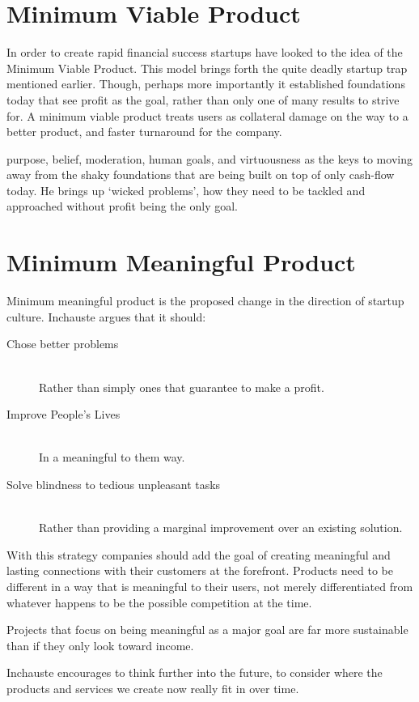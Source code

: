 \section{Minimum Viable Product}

In order to create rapid financial success startups have looked to the idea of the Minimum Viable Product. This model brings forth the quite deadly startup trap mentioned earlier. Though, perhaps more importantly it established foundations today that see profit as the goal, rather than only one of many results to strive for. A minimum viable product treats users as collateral damage on the way to a better product, and faster turnaround for the company.

 purpose, belief, moderation, human goals, and virtuousness as the keys to moving away from the shaky foundations that are being built on top of only cash-flow today. He brings up `wicked problems', how they need to be tackled and approached without profit being the only goal.

\section{Minimum Meaningful Product}

Minimum meaningful product is the proposed change in the direction of startup culture. Inchauste argues that it should:
\begin{description}
  \item[Chose better problems] \hfill \\ Rather than simply ones that guarantee to make a profit.
  \item[Improve People's Lives] \hfill \\ In a meaningful to them way.
  \item[Solve blindness to tedious unpleasant tasks] \hfill \\ Rather than providing a marginal improvement over an existing solution.
\end{description}

With this strategy companies should add the goal of creating meaningful and lasting connections with their customers at the forefront. Products need to be different in a way that is meaningful to their users, not merely differentiated from whatever happens to be the possible competition at the time.

Projects that focus on being meaningful as a major goal are far more sustainable than if they only look toward income. 

Inchauste encourages to think further into the future, to consider where the products and services we create now really fit in over time.

\nocite{Inchauste}



